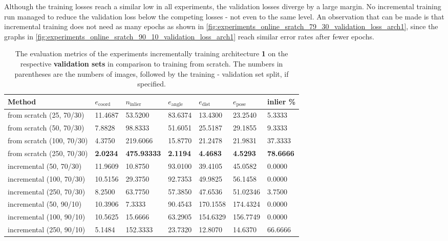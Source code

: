 Although the training losses reach a similar low in all experiments, the validation losses diverge by a large margin. No incremental training run managed to reduce the validation loss below the competing losses - not even to the same level. An observation that can be made is that incremental training does not need as many epochs as shown in \fig \ref{fig:experiments_online_sratch_79_30_validation_loss_arch1}, since the graphs in \fig \ref{fig:experiments_online_sratch_90_10_validation_loss_arch1} reach similar error rates after fewer epochs. 

\begin{table}[!t]
\centering
\begin{tabular}{l||llllll} 
Method                   & $e_{\text{coord}}$ & $n_{\text{inlier}}$ & $e_{\text{angle}}$ & $e_{\text{dist}}$ & $e_{\text{pose}}$  & inlier \% \\ \hline \hline 
from scratch (25, 70/30)        & 11.4687            & 53.5200             & 83.6374            & 13.4300           & 23.2540  & 5.3333          \\ \hline
from scratch (50, 70/30)        & 7.8828             & 98.8333             & 51.6051            & 25.5187           & 29.1855 & 9.3333          \\ \hline 
from scratch (100, 70/30)       & 4.3750             & 219.6066            & 15.8770            & 21.2478            & 21.9831    &37.3333       \\ \hline
from scratch (250, 70/30)       & \textbf{2.0234}    & \textbf{475.93333}  & \textbf{2.1194}   &\textbf{4.4683}    & \textbf{4.5293} & \textbf{78.6666}            \\ \hline \hline
incremental (50, 70/30)  & 11.9609            & 10.8750            & 93.0100           & 39.4105           & 45.0582  &0.0000          \\ \hline
incremental (100, 70/30) & 10.5156            & 29.3750             & 92.7353           & 49.9825           & 56.1458  &0.0000         \\ \hline 
incremental (250, 70/30) & 8.2500             & 63.7750             & 57.3850             & 47.6536           & 51.02346 & 3.7500       \\ \hline \hline
incremental (50, 90/10)  & 10.3906            & 7.3333                   & 90.4543           & 170.1558           & 174.4324  &0.0000        \\ \hline 
incremental (100, 90/10) & 10.5625             & 15.6666                  & 63.2905            & 154.6329          & 156.7749  &0.0000        \\ \hline
incremental (250, 90/10) & 5.1484             & 152.3333                 & 23.7320            & 12.8070            &  14.6370   & 66.6666      
\end{tabular}
\caption{The evaluation metrics of the experiments incrementally training architecture \textbf{1} on the respective \textbf{validation sets} in comparison to training from scratch. The numbers in parentheses are the numbers of images, followed by the training - validation set split, if specified.}
\label{table:experiments_online_sratch_arch1}
\end{table}

